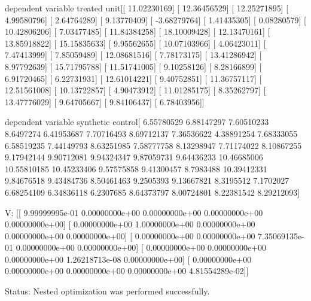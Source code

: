 dependent variable treated unit[[ 11.02230169]
 [ 12.36456529]
 [ 12.25271895]
 [  4.99580796]
 [  2.64764289]
 [  9.13770409]
 [ -3.68279764]
 [  1.41435305]
 [  0.08280579]
 [ 10.42806206]
 [  7.03477485]
 [ 11.84384258]
 [ 18.10009428]
 [ 12.13470161]
 [ 13.85918822]
 [ 15.15835633]
 [  9.95562655]
 [ 10.07103966]
 [  4.06423011]
 [  7.47413999]
 [  7.85059489]
 [ 12.08681516]
 [  7.78173175]
 [ 13.41286942]
 [  8.97792639]
 [ 15.71795788]
 [ 11.51741005]
 [  9.10258126]
 [  8.28166899]
 [  6.91720465]
 [  6.22731931]
 [ 12.61014221]
 [  9.40752851]
 [ 11.36757117]
 [ 12.51561008]
 [ 10.13722857]
 [  4.90473912]
 [ 11.01285175]
 [  8.35262797]
 [ 13.47776029]
 [  9.64705667]
 [  9.84106437]
 [  6.78403956]]

dependent variable synthetic control[  6.55780529   6.88147297   7.60510233   8.6497274    6.41953687
   7.70716493   8.69712137   7.36536622   4.38891254   7.68333055
   6.58519235   7.44149793   8.63251985   7.58777758   8.13298947
   7.71174022   8.10867255   9.17942144   9.90712081   9.94324347
   9.87059731   9.64436233  10.46685006  10.55810185  10.45233406
   9.57575858   9.41300457   8.7983488   10.39412331   9.84676518
   9.43484736   8.50461463   9.2505393    9.13667821   8.3195512
   7.1702027    6.68254109   6.34836118   6.2307685    8.64373797
   8.00724801   8.22381542   8.29212093]

 V:
[[  9.99999995e-01   0.00000000e+00   0.00000000e+00   0.00000000e+00
    0.00000000e+00]
 [  0.00000000e+00   1.00000000e+00   0.00000000e+00   0.00000000e+00
    0.00000000e+00]
 [  0.00000000e+00   0.00000000e+00   7.35069135e-01   0.00000000e+00
    0.00000000e+00]
 [  0.00000000e+00   0.00000000e+00   0.00000000e+00   1.26218713e-08
    0.00000000e+00]
 [  0.00000000e+00   0.00000000e+00   0.00000000e+00   0.00000000e+00
    4.81554289e-02]]

 Status:
Nested optimization was performed successfully.